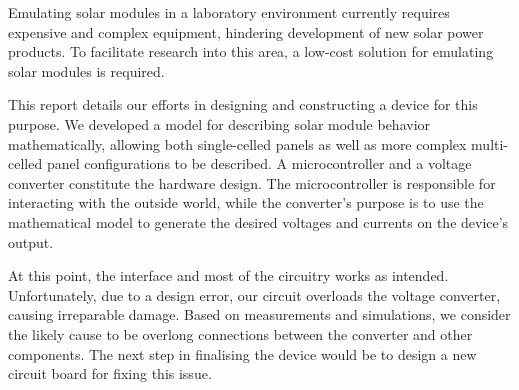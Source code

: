 

Emulating  solar  modules  in  a  laboratory  environment  currently  requires
expensive  and complex  equipment, hindering  development of  new solar  power
products. To  facilitate research  into  this area,  a  low-cost solution  for
emulating solar modules is required.

This report details our efforts in designing and constructing  a device for this
purpose.   We   developed   a   model  for  describing  solar  module   behavior
mathematically,  allowing both single-celled panels  as  well  as  more  complex
multi-celled panel configurations  to  be  described.  A  microcontroller  and a
voltage  converter  constitute  the  hardware  design.  The  microcontroller  is
responsible  for interacting with  the  outside  world,  while  the  converter's
purpose is to use the mathematical model  to  generate  the desired voltages and
currents on the device's output.

At this point, the interface  and  most  of  the  circuitry  works  as intended.
Unfortunately,  due  to  a  design  error,  our  circuit  overloads  the voltage
converter, causing irreparable damage. Based on measurements and simulations, we
consider the likely cause to be overlong connections between  the  converter and
other components. The next step in finalising the device would  be  to  design a
new circuit board for fixing this issue.

